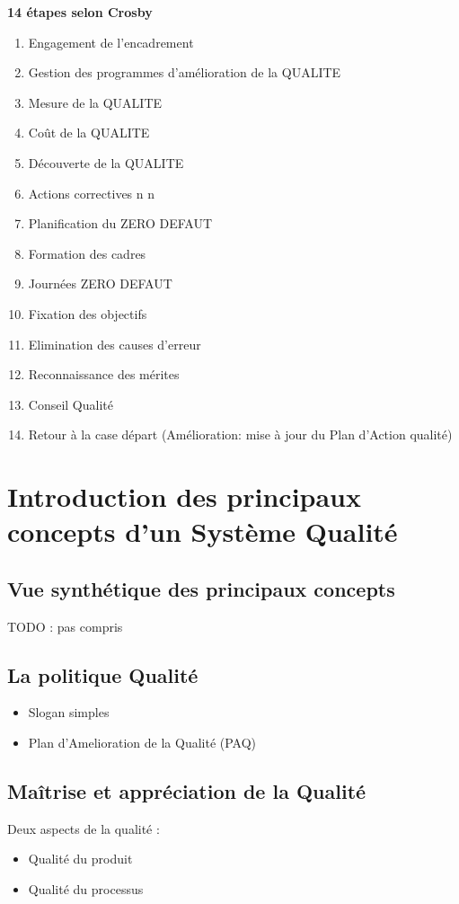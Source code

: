 \textbf{14 étapes selon Crosby}
\begin{enumerate}
\item Engagement de l'encadrement
\item Gestion des programmes d'amélioration de la QUALITE
\item Mesure de la QUALITE
\item Coût de la QUALITE
\item Découverte de la QUALITE
\item Actions correctives n n
\item Planification du ZERO DEFAUT
\item Formation des cadres 
\item Journées ZERO DEFAUT 
\item Fixation des objectifs
\item Elimination des causes d'erreur
\item Reconnaissance des mérites
\item Conseil Qualité
\item Retour à la case départ (Amélioration: mise à jour du Plan d'Action qualité)
\end{enumerate}


\section{Introduction des principaux concepts d'un Système Qualité}

	\subsection{Vue synthétique des principaux concepts}
TODO : pas compris

	\subsection{La politique Qualité}
	\begin{itemize}
	\item Slogan simples
	\item Plan d’Amelioration de la Qualité (PAQ)
	\end{itemize}

	\subsection{Maîtrise et appréciation de la Qualité}
Deux aspects de la qualité :
	\begin{itemize}
	\item Qualité du produit
	\item Qualité du processus
	\end{itemize}

